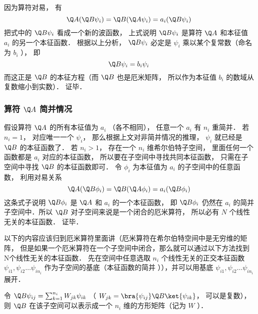 因为算符对易， 有
\begin{equation}
\Q A (\Q B \psi _i) = \Q B (\Q A \psi _i) = a_i (\Q B \psi _i)
\end{equation}
把式中的 $\Q B \psi_i$ 看成一个新的波函数， 上式说明 $\Q B \psi_i$ 是算符 $\Q A$ 和本征值 $a_i$ 的另一个本征函数． 根据以上分析， $\Q B \psi_i$ 必定是 $\psi _i$ 乘以某个复常数（命名为 $b_i$ ）， 即
\begin{equation}
\Q B \psi_i = b_i \psi_i
\end{equation}
而这正是 $\Q B$ 的本征方程（而 $\Q B$ 也是厄米矩阵， 所以作为本征值 $b_i$ 的数域从复数缩小到实数）． 证毕．

\subsubsection{算符 $\Q A$ 简并情况}
假设算符 $\Q A$ 的所有本征值为 $a_i$ （各不相同）， 任意一个 $a_i$ 有 $n_i$ 重简并． 若 $n_i = 1$，  对应唯一一个 $\psi_i$，  那么根据上文对非简并情况的推理， $\psi_i$ 就已经是 $\Q B$ 的本征函数了． 若 $n_i > 1$，  存在一个 $n_i$ 维希尔伯特子空间， 里面任何一个函数都是 $a_i$ 对应的本征函数， 所以要在子空间中寻找共同本征函数， 只需在子空间中寻找 $\Q B$ 的本征函数即可． 令 $\phi _i$ 为本征值为 $a_i$ 的子空间中的任意函数， 利用对易关系
\begin{equation}
\Q A (\Q B \phi _i) = \Q B (\Q A \phi _i) = a_i (\Q B \phi_i)
\end{equation}
这条式子说明 $\Q B \phi_i$ 是 $\Q A$ 和 $a_i$ 的一个本征函数， 即 $\Q B \phi_i$ 仍然在 $a_i$ 的简并子空间中．所以 $\Q B$ 对子空间来说是一个闭合的厄米算符， 所以必有 $N$ 个线性无关的本征函数． 证毕．%

以下的内容应该归到厄米算符里面讲（厄米算符在希尔伯特空间中是无穷维的矩阵， 但是如果一个厄米算符在一个子空间中闭合，那么就可以通过以下方法找到N个线性无关的本征函数．%
先在空间中任意选取 $n_i$ 个线性无关的正交本征函数 $\psi_{i1}, \psi_{i2}\dots \psi_{i n_i}$ 作为子空间的基底（本征函数的简并%
）），并可以用基底 $\psi_{i1}, \psi_{i2}\dots \psi_{i n_i}$ 展开．

令 $\Q B \psi_{ij} = \sum_{k=1}^{n_i} W_{jk}\psi_{ik}$ （ $W_{jk} = \bra{\psi_{ij}} \Q B \ket{\psi_{ik}}$， 可以是复数）， 则 $\Q B$ 在该子空间可以表示成一个 $n_i$ 维的方形矩阵（记为 $W$ ）．

